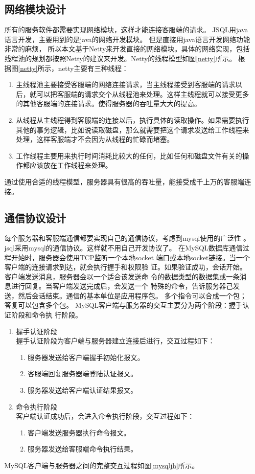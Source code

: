 \subsection{网络模块设计}
所有的服务软件都需要实现网络模块，这样才能连接客服端的请求。
JSQL用java语言开发，主要用到的是java的网络开发模块。
但是直接用java语言开发网络功能非常的麻烦，
所以本文基于Netty来开发直接的网络模块。具体的网络实现，包括
线程池的规划都按照Netty的建议来开发。Netty的线程模型如图\ref{netty}所示。
根据图\ref{netty}所示，netty主要有三种线程：
\begin{enumerate}
	\item 主线程池主要接受客服端的网络连接请求，当主线程接受到客服端的请求以后，就可以把客服端的请求交个从线程池来处理。这样主线程就可以接受更多的其他客服端的连接请求。使得服务器的吞吐量大大的提高。
	\item 从线程从主线程得到客服端的连接以后，执行具体的读取操作。如果需要执行其他的事务逻辑，比如说读取磁盘，那么就需要把这个请求发送给工作线程来处理，这样客服端才不会因为从线程的忙碌而堵塞。
	\item 工作线程主要用来执行时间消耗比较大的任何，比如任何和磁盘文件有关的操作都应该放在工作线程来处理。
\end{enumerate}
通过使用合适的线程模型，服务器具有很高的吞吐量，能接受成千上万的客服端连接。
\subsection{通信协议设计}
每个服务器和客服端通信都要实现自己的通信协议，考虑到mysql使用的广泛性
。jsql采用mysql的通信协议。这样就不用自己开发协议了。
在MySQL数据库通信过程开始时，服务器会使用TCP监听一个本地socket
端口或本地socket链接。当一个客户端的连接请求到达，就会执行握手和权限验
证。如果验证成功，会话开始。客户端发送消息，服务器会以一个适合该发送命
令的数据类型的数据集或一条消息进行回复。当客户端发送完成后，会发送一个
特殊的命令，告诉服务器己发送，然后会话结束。通信的基本单位是应用程序包。
多个指令可以合成一个包；答复可以包含多个包。
MySQL客户端与服务器的交互主要分为两个阶段：握手认证阶段和命令执
行阶段。

\begin{enumerate}
	\item 握手认证阶段\\
	握手认证阶段为客户端与服务器建立连接后进行，交互过程如下：
	\begin{enumerate}
		\item 服务器发送给客户端握手初始化报文。
		\item 客服端回复服务器端登陆认证报文。
		\item 服务器发送给客户端认证结果报文。
	\end{enumerate}
	\item 命令执行阶段\\
	客户端认证成功后，会进入命令执行阶段，交互过程如下：
	\begin{enumerate}
		\item 	客户端发送服务器执行命令报文。
		\item 服务器发送给客服端命令执行结果。
	\end{enumerate}
\end{enumerate}
MySQL客户端与服务器之间的完整交互过程如图\ref{mysqljh}所示。

